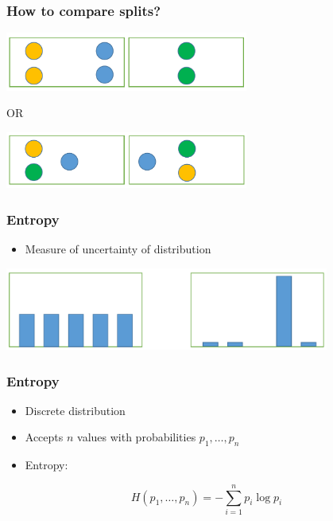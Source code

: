 \documentclass[default]{beamer}
\begin{document}
	\begin{frame}
		\frametitle{How to compare splits?}
		\centering
		\includegraphics[width=0.6\textwidth]{trees19.png}
		\par\bigskip
		\par\bigskip
		\par\bigskip
		
		\Large
		OR
		\par\bigskip
		\par\bigskip
		\par\bigskip
		
		\includegraphics[width=0.6\textwidth]{trees20.png}
	\end{frame}

	\begin{frame}
		\frametitle{Entropy}
		\Large
		\begin{itemize}
			\item Measure of uncertainty of distribution
		\end{itemize}
		\par\bigskip
		\par\bigskip
		
		\centering
		\includegraphics[width=0.8\textwidth]{trees21.png}
		
	\end{frame}

	\begin{frame}
		\frametitle{Entropy}
		\Large
		\begin{itemize}
			\item Discrete distribution
			\item Accepts $n$ values with probabilities $p_1,\dots, p_n$
			\item Entropy:
		\end{itemize}
	
		\[
			H(p_1,\dots,p_n)=-\sum_{i=1}^{n}p_i\log p_i
		\]
	\end{frame}
	
\end{document}
